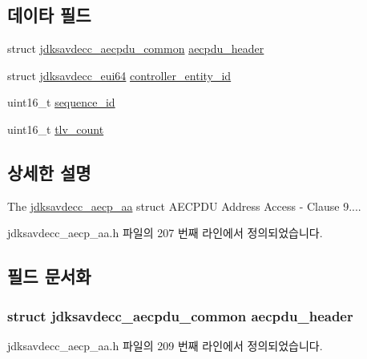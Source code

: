 \subsection*{데이타 필드}
\begin{DoxyCompactItemize}
\item 
struct \hyperlink{structjdksavdecc__aecpdu__common}{jdksavdecc\+\_\+aecpdu\+\_\+common} \hyperlink{structjdksavdecc__aecp__aa_ae8460ae179666e7ce268ed1ef33d0de3}{aecpdu\+\_\+header}
\item 
struct \hyperlink{structjdksavdecc__eui64}{jdksavdecc\+\_\+eui64} \hyperlink{structjdksavdecc__aecp__aa_affc928ddb4fc62d1d04a775d36e5f2c8}{controller\+\_\+entity\+\_\+id}
\item 
uint16\+\_\+t \hyperlink{structjdksavdecc__aecp__aa_a8f184eb7c16a6d3a501c383ee8ffa200}{sequence\+\_\+id}
\item 
uint16\+\_\+t \hyperlink{structjdksavdecc__aecp__aa_a038fe0548939dfb79822e59885732e2a}{tlv\+\_\+count}
\end{DoxyCompactItemize}


\subsection{상세한 설명}
The \hyperlink{structjdksavdecc__aecp__aa}{jdksavdecc\+\_\+aecp\+\_\+aa} struct A\+E\+C\+P\+DU Address Access -\/ Clause 9.... 

jdksavdecc\+\_\+aecp\+\_\+aa.\+h 파일의 207 번째 라인에서 정의되었습니다.



\subsection{필드 문서화}
\subsubsection[{\texorpdfstring{aecpdu\+\_\+header}{aecpdu_header}}]{\setlength{\rightskip}{0pt plus 5cm}struct {\bf jdksavdecc\+\_\+aecpdu\+\_\+common} aecpdu\+\_\+header}\hypertarget{structjdksavdecc__aecp__aa_ae8460ae179666e7ce268ed1ef33d0de3}{}\label{structjdksavdecc__aecp__aa_ae8460ae179666e7ce268ed1ef33d0de3}


jdksavdecc\+\_\+aecp\+\_\+aa.\+h 파일의 209 번째 라인에서 정의되었습니다.

